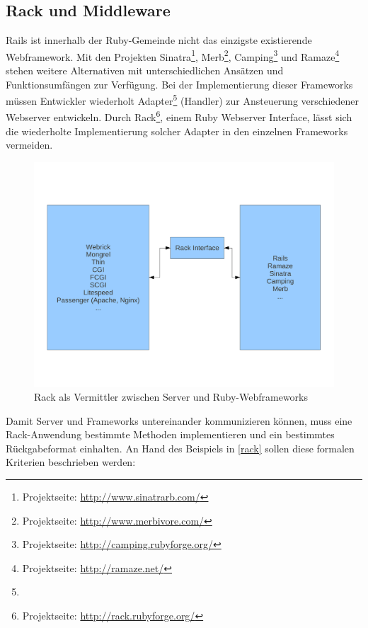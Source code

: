 \subsection{Rack und Middleware}
\label{grundrack}
Rails ist innerhalb der Ruby-Gemeinde nicht das einzigste existierende Webframework. Mit den Projekten Sinatra\footnote{Projektseite: \href{http://www.sinatrarb.com/}{http://www.sinatrarb.com/}}, Merb\footnote{Projektseite: \href{http://www.merbivore.com/}{http://www.merbivore.com/}}, Camping\footnote{Projektseite: \href{http://camping.rubyforge.org/}{http://camping.rubyforge.org/}} und Ramaze\footnote{Projektseite: \href{http://ramaze.net/}{http://ramaze.net/}} stehen weitere Alternativen mit unterschiedlichen Ansätzen und Funktionsumfängen zur Verfügung.
Bei der Implementierung dieser Frameworks müssen Entwickler wiederholt Adapter\footnote{} (Handler) zur Ansteuerung verschiedener Webserver entwickeln. Durch Rack\footnote{Projektseite: \href{http://rack.rubyforge.org/}{http://rack.rubyforge.org/}}, einem Ruby Webserver Interface, lässt sich die wiederholte Implementierung solcher Adapter in den einzelnen Frameworks vermeiden.
\begin{figure}[!h]
\begin{center}
\includegraphics[scale=0.47]{images/rack/rack.pdf}
\caption{Rack als Vermittler zwischen Server und Ruby-Webframeworks}
\label{rackschema}
\end{center}
\end{figure}


Damit Server und Frameworks untereinander kommunizieren können, muss eine Rack-Anwendung bestimmte Methoden implementieren und ein bestimmtes Rückgabeformat einhalten. An Hand des Beispiels in \ref{rack} sollen diese formalen Kriterien beschrieben werden:

